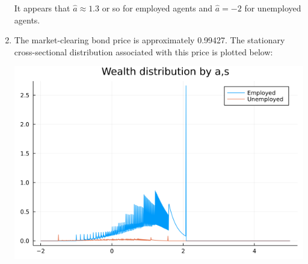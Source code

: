 \documentclass[12pt]{article}
\begin{document}
\begin{enumerate}[label=\alph*) ]
    It appears that $\hat{a} \approx 1.3$ or so for employed agents and $\hat{a} =-2$ for unemployed agents.
    \item The market-clearing bond price is approximately 0.99427. The stationary cross-sectional distribution associated with this price is plotted below:
    \begin{center}
        \includegraphics[scale=0.5]{wealthplot.png}
    \end{center}
\end{enumerate}
\end{document}
